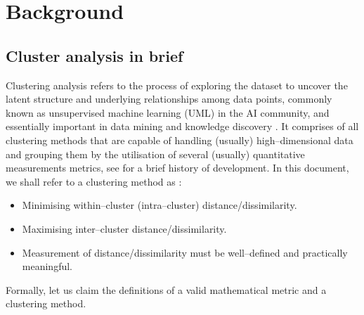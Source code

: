 \section{Background}
\label{sec:background}

\subsection{Cluster analysis in brief}
\label{sec:background:overview}


Clustering analysis refers to the process of exploring the dataset to uncover the latent structure and underlying relationships among data points, commonly known as unsupervised machine learning (UML) in the AI community, and essentially important in data mining and knowledge discovery \cite{ref_1}.
It comprises of all clustering methods that are capable of handling (usually) high–dimensional data and grouping them by the utilisation of several (usually) quantitative measurements metrics, see \cite{ref_6} for a brief history of development.
In this document, we shall refer to a clustering method as \cite{ref_5}:
\begin{itemize}
    \item Minimising within–cluster (intra–cluster) distance/dissimilarity.
    \item Maximising inter–cluster distance/dissimilarity.
    \item Measurement of distance/dissimilarity must be well–defined and practically meaningful.
\end{itemize}
Formally, let us claim the definitions of a valid mathematical metric and a clustering method.

